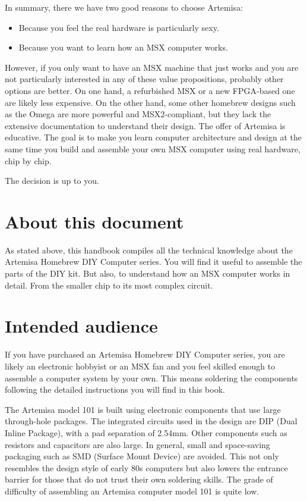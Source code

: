 In summary, there we have two good reasons to choose Artemisa: 
\begin{itemize}
	\item Because you feel the real hardware is particularly sexy.
	\item Because you want to learn how an MSX computer works.
\end{itemize}

However, if you only want to have an MSX machine that just works and you are not particularly interested in any of these value propositions, probably other options are better. On one hand, a refurbished MSX or a new FPGA-based one are likely less expensive. On the other hand, some other homebrew designs such as the Omega are more powerful and MSX2-compliant, but they lack the extensive documentation to understand their design. The offer of Artemisa is educative. The goal is to make you learn computer architecture and design at the same time you build and assemble your own MSX computer using real hardware, chip by chip. 

The decision is up to you.

\section{About this document}

As stated above, this handbook compiles all the technical knowledge about the Artemisa Homebrew DIY Computer series. You will find it useful to assemble the parts of the DIY kit. But also, to understand how an MSX computer works in detail. From the smaller chip to its most complex circuit. 

\section{Intended audience}

If you have purchased an Artemisa Homebrew DIY Computer series, you are likely an electronic hobbyist or an MSX fan and you feel skilled enough to assemble a computer system by your own. This means soldering the components following the detailed instructions you will find in this book. 

The Artemisa model 101 is built using electronic components that use large through-hole packages. The integrated circuits used in the design are DIP (Dual Inline Package), with a pad separation of 2.54mm. Other components such as resistors and capacitors are also large. In general, small and space-saving packaging such as SMD (Surface Mount Device) are avoided. This not only resembles the design style of early 80s computers but also lowers the entrance barrier for those that do not trust their own soldering skills. The grade of difficulty of assembling an Artemisa computer model 101 is quite low. 


